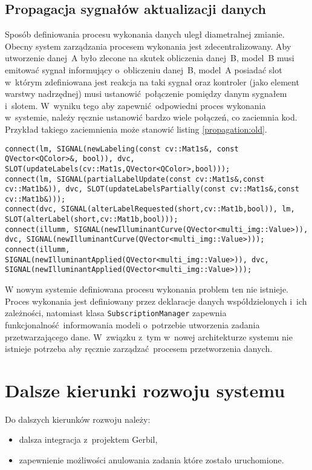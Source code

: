 \subsection{Propagacja sygnałów aktualizacji danych}

Sposób definiowania procesu wykonania danych uległ diametralnej zmianie. Obecny system zarządzania procesem wykonania jest zdecentralizowany. Aby utworzenie danej~A było zlecone na skutek obliczenia danej~B, model~B musi emitować sygnał informujący o~obliczeniu danej~B, model~A posiadać slot w~którym zdefiniowana jest reakcja na taki sygnał oraz kontroler (jako element warstwy nadrzędnej) musi ustanowić połączenie pomiędzy danym sygnałem i~slotem. W~wyniku tego aby zapewnić odpowiedni proces wykonania w~systemie, należy ręcznie ustanowić bardzo wiele połączeń, co zaciemnia kod. Przykład takiego zaciemnienia może stanowić listing \ref{propagation:old}.

\begin{minipage}{\textwidth}
	\begin{lstlisting}[label=propagation:old, caption={Przykład definiowania procesu wykonania według starego systemu},alsoletter={()[].=}]
connect(lm, SIGNAL(newLabeling(const cv::Mat1s&, const QVector<QColor>&, bool)), dvc, SLOT(updateLabels(cv::Mat1s,QVector<QColor>,bool)));
connect(lm, SIGNAL(partialLabelUpdate(const cv::Mat1s&,const cv::Mat1b&)), dvc, SLOT(updateLabelsPartially(const cv::Mat1s&,const cv::Mat1b&)));
connect(dvc, SIGNAL(alterLabelRequested(short,cv::Mat1b,bool)), lm, SLOT(alterLabel(short,cv::Mat1b,bool)));
connect(illumm, SIGNAL(newIlluminantCurve(QVector<multi_img::Value>)), dvc, SIGNAL(newIlluminantCurve(QVector<multi_img::Value>)));
connect(illumm, SIGNAL(newIlluminantApplied(QVector<multi_img::Value>)), dvc, SIGNAL(newIlluminantApplied(QVector<multi_img::Value>)));
	\end{lstlisting}
\end{minipage}

W nowym systemie definiowana procesu wykonania problem ten nie istnieje. Proces wykonania jest definiowany przez deklaracje danych współdzielonych i~ich zależności, natomiast klasa \lstinline$SubscriptionManager$ zapewnia funkcjonalność informowania modeli o~potrzebie utworzenia zadania przetwarzającego dane. W~związku z~tym w~nowej architekturze systemu nie istnieje potrzeba aby ręcznie zarządzać procesem przetworzenia danych.

\section{Dalsze kierunki rozwoju systemu}
Do dalszych kierunków rozwoju należy:
\begin{itemize}
	\item dalsza integracja z~projektem Gerbil,
	\item zapewnienie możliwości anulowania zadania które zostało uruchomione.
\end{itemize}
